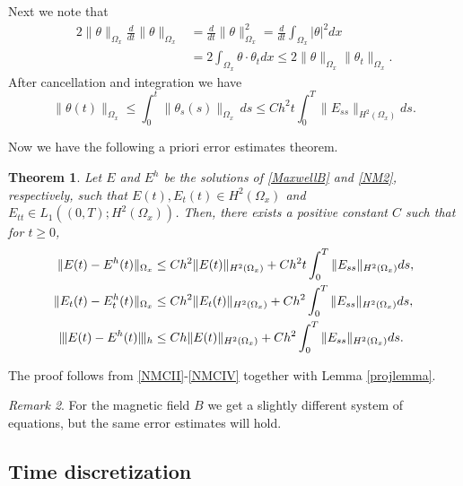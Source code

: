 \documentclass[reqno,a4paper]{amsart}
\newtheorem{theorem}{Theorem}[section]
\theoremstyle{remark}
\newtheorem{remark}[theorem]{Remark}
\numberwithin{equation}{section}
\newcommand{\norm}[1]{\|#1\|}
\newcommand{\Tnorm}[1]{|\mkern-1mu|\mkern-1mu|#1|\mkern-1mu|\mkern-1mu|}
\begin{document}
Next we note that
\[
\begin{aligned}
2 \norm{\theta}_{\Omega_x} \frac{d}{dt} \norm{\theta}_{\Omega_x}
&= \frac{d}{dt} \norm{\theta}^2_{\Omega_x}
= \frac{d}{dt} \int_{\Omega_x} | \theta|^2 dx \\
&= 2 \int_{\Omega_x} \theta \cdot \theta_t dx
\leq 2 \norm{\theta}_{\Omega_x} \norm{\theta_t }_{\Omega_x}.
\end{aligned}
\]
After cancellation and integration we have
\begin{equation} \label{NMCIV}
\norm{\theta (t)}_{\Omega_x} \leq \int^t_0 \norm{\theta_s (s)}_{\Omega_x}\,  ds 
\leq C h^2 t \int^T_0 \norm{E_{ss}}_{H^2(\Omega_x)} ds.
\end{equation}

Now we have the following a priori error estimates theorem.
\begin{theorem}\label{semidiscTh}
Let $ E $ and $ E^h $ be the solutions of \eqref{MaxwellB} and \eqref{NM2}, 
respectively, such that
$E(t),E_t(t)\in H^2(\Omega_x) $
and $E_{tt}\in L_1\left((0,T);H^2(\Omega_x)\right)$.
Then, there exists a positive constant $ C $ such that for $ t \geq 0$,
\[
\begin{aligned}
\norm{E (t) - E^h (t)}_{\Omega_x} &\leq C h^2 \norm{E (t)}_{H^2(\Omega_x)} + C h^2 t \int^T_0 \norm{E_{ss}}_{H^2(\Omega_x)} ds, \\
\norm{E_t (t) - E^h_t (t)}_{\Omega_x} &\leq C h^2 \norm{E_t (t)}_{H^2(\Omega_x)} + C h^2 \int^T_0 \norm{E_{ss}}_{H^2(\Omega_x)} ds, \\
\Tnorm{E (t) - E^h (t)}_h &\leq C h \norm{E (t)}_{H^2(\Omega_x)} + C h^2 \int^T_0 \norm{E_{ss}}_{H^2(\Omega_x)} ds.
\end{aligned}
\]
\end{theorem}
The proof follows from \eqref{NMCII}-\eqref{NMCIV} together with Lemma \ref{projlemma}.
\begin{remark}
For the magnetic field $ B $ we get a slightly different system of equations,
but the same error estimates will hold.
\end{remark}

\subsection{Time discretization}
\end{document}
